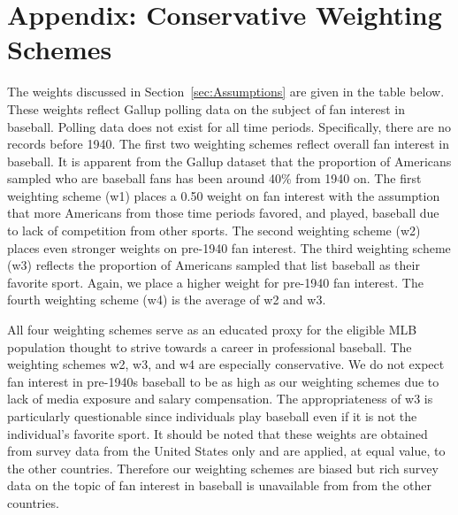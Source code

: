 \documentclass[11pt]{article}\usepackage[]{graphicx}\usepackage[]{color}
\begin{document}
\section*{Appendix: Conservative Weighting Schemes}
The weights discussed in Section~\ref{sec:Assumptions} are given in the table 
below.  These weights reflect Gallup polling data 
on the subject of fan interest in baseball. 
Polling data does not exist for all time periods.  
Specifically, there are no records before 1940. The first two weighting 
schemes reflect overall fan interest in baseball. It is apparent from the 
Gallup dataset that the proportion of Americans sampled who are baseball fans 
has been around 40\% from 1940 on. The first weighting scheme (w1) places a 
0.50 weight on fan interest with the assumption that more Americans from those 
time periods favored, and played, baseball due to lack of competition from 
other sports. The second weighting scheme (w2) places even stronger weights 
on pre-1940 fan interest.  The third weighting scheme (w3) 
reflects the proportion of Americans sampled that list baseball as their 
favorite sport.  Again, we place a higher weight for pre-1940 fan interest.  
The fourth weighting scheme (w4) is the average of w2 and w3.  

All four weighting schemes serve as an educated proxy for the eligible MLB 
population thought to strive towards a career in professional baseball.  The 
weighting schemes w2, w3, and w4 are especially conservative.  We do not 
expect fan interest in pre-1940s baseball to be as high as our weighting 
schemes due to lack of media exposure and salary compensation.  
The appropriateness of w3 is particularly questionable since individuals play 
baseball even if it is not the individual's favorite sport.  It should be noted 
that these weights are obtained from survey data from the United States 
only and are applied, at equal value, to the other countries. Therefore our
weighting schemes are biased but rich survey data on the topic of fan 
interest in baseball is unavailable from from the other countries. 
\end{document}
